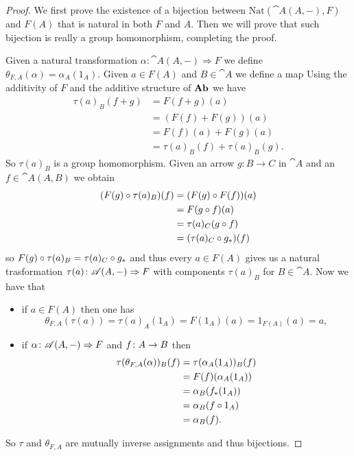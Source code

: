 \begin{proof}
  We first prove the existence of a bijection between \(\text{Nat}(\cat{A}(A,-),F)\) and \(F(A)\) that is natural in both \(F\) and \(A\). Then we will prove that such bijection is really a group homomorphism, completing the proof.

  Given a natural transformation \(\alpha\colon\cat{A}(A,-)\Rightarrow F\) we define \(\theta_{F,A}(\alpha) = \alpha_A(1_A)\). Given \(a\in F(A)\) and \(B\in\cat{A}\) we define a map
  Using the additivity of \(F\) and the additive structure of \(\text{\normalfont\textbf{Ab}}\) we have
  \begin{align*}
    \tau(a)_B(f+g) &= F(f + g)(a)\\
                   &= (F(f) + F(g))(a)\\
                   &= F(f)(a) + F(g)(a)\\
                   &= \tau(a)_B(f) + \tau(a)_B(g).
  \end{align*}
  So \(\tau(a)_B\) is a group homomorphism. Given an arrow \(g\colon B\to C\) in \(\cat{A}\) and an \(f\in\cat{A}(A,B)\) we obtain
  \begin{align*}
    (F(g)\circ\tau(a)_B)(f) &= (F(g)\circ F(f))(a)\\
                            &= F(g\circ f)(a)\\
                            &= \tau(a)_C(g\circ f)\\
                            &= (\tau(a)_C\circ{g}_*)(f)
  \end{align*}
  so \(F(g)\circ\tau(a)_B = \tau(a)_C\circ{g}_*\) and thus every \(a\in F(A)\) gives us a natural trasformation \(\tau(a)\colon {\mathscr A}(A,-)\Rightarrow F\) with components \(\tau(a)_B\) for \(B\in\cat{A}\). Now we have that
  \begin{itemize}
  \item  if \(a\in F(A)\) then one has
    \begin{equation*}
      \theta_{F,A}(\tau(a)) = \tau(a)_A(1_A) = F(1_A)(a) = 1_{F(A)}(a) = a,
    \end{equation*}
  \item if \(\alpha\colon {\mathscr A}(A,-)\Rightarrow F\) and \(f\colon A\to B\) then
    \begin{align*}
      \tau(\theta_{F,A}(\alpha))_B(f) &= \tau(\alpha_A(1_A))_B(f)\\
                                      &= F(f)(\alpha_A(1_A))\\
                                      &= \alpha_B({f}_*(1_A))\\
                                      &= \alpha_B(f\circ 1_A)\\
                                      &= \alpha_B(f).
  \end{align*}
  \end{itemize}
  So \(\tau\) and \(\theta_{F,A}\) are mutually inverse assignments and thus bijections.


\end{proof}
